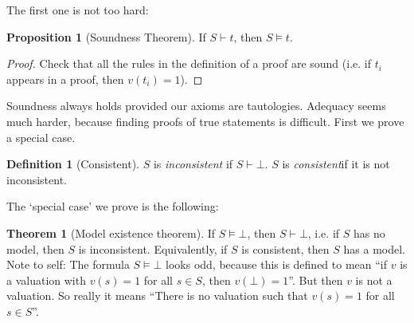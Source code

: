 \documentclass{article}
\theoremstyle{definition}
\newtheorem{definition}{Definition}
\newtheorem{proposition}{Proposition}
\newtheorem{theorem}{Theorem}
\numberwithin{definition}{section}
\newcommand{\entails}{\models}
\newcommand{\proves}{\vdash}
\begin{document}
The first one is not too hard:
\begin{proposition}[Soundness Theorem]
If $S \proves t$, then $S \entails t$. 
\end{proposition}
\begin{proof}
Check that all the rules in the definition of a proof are sound (i.e. if $t_{i}$ appears in a proof, then $v(t_{i})=1$). 
\end{proof}
Soundness always holds provided our axioms are tautologies. Adequacy seems much harder, because finding proofs of true statements is difficult. First we prove a special case.
\begin{definition}[Consistent]
$S$ is \textit{inconsistent} if $S \proves \bot$. $S$ is \textit{consistent}if it is not inconsistent.
\end{definition}
The `special case' we prove is the following:
\begin{theorem}[Model existence theorem]
If $S \entails \bot$, then $S \proves \bot$, i.e. if $S$ has no model, then $S$ is inconsistent. Equivalently, if $S$ is consistent, then $S$ has a model. Note to self: The formula $S \entails \bot$ looks odd, because this is defined to mean ``if $v$ is a valuation with $v(s)=1$ for all $s \in S$, then $v(\bot)=1$''. But then $v$ is not a valuation. So really it means ``There is no valuation such that $v(s)=1$ for all $s \in S$''.
\end{theorem}
\end{document}
